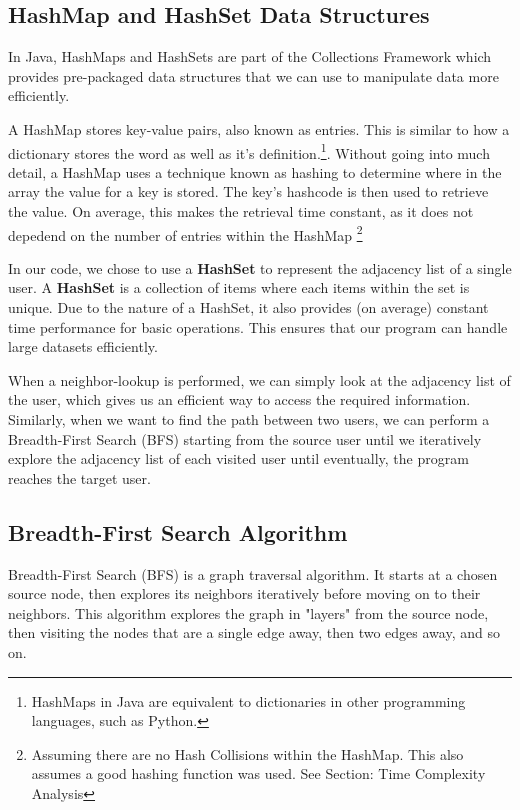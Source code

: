 \subsection*{HashMap and HashSet Data Structures}
In Java, HashMaps and HashSets are part of the Collections Framework which provides pre-packaged data structures that we can use to manipulate data more efficiently.

A HashMap stores key-value pairs, also known as entries. This is similar to how a dictionary stores the word as well as it's definition.\footnote{HashMaps in Java are equivalent to dictionaries in other programming languages, such as Python.}. Without going into much detail, a HashMap uses a technique known as hashing to determine where in the array the value for a key is stored. The key's hashcode is then used to retrieve the value. On average, this makes the retrieval time constant, as it does not depedend on the number of entries within the HashMap \footnote{Assuming there are no Hash Collisions within the HashMap. This also assumes a good hashing function was used. See Section: Time Complexity Analysis}\cite{bajracharya}

In our code, we chose to use a \textbf{HashSet} to represent the adjacency list of a single user. A \textbf{HashSet} is a collection of items where each items within the set is unique. Due to the nature of a HashSet, it also provides (on average) constant time performance for basic operations. This ensures that our program can handle large datasets efficiently.

When a neighbor-lookup is performed, we can simply look at the adjacency list of the user, which gives us an efficient way to access the required information. Similarly, when we want to find the path between two users, we can perform a Breadth-First Search (BFS) starting from the source user until we iteratively explore the adjacency list of each visited user until eventually, the program reaches the target user.

\subsection*{Breadth-First Search Algorithm}
Breadth-First Search (BFS) is a graph traversal algorithm. It starts at a chosen source node, then explores its neighbors iteratively before moving on to their neighbors. This algorithm explores the graph in "layers" from the source node, then visiting the nodes that are a single edge away, then two edges away, and so on.

